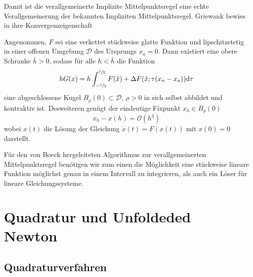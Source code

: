 Damit ist die verallgemeinerte Implizite Mittelpunktsregel eine echte Verallgemeinerung der bekannten Impliziten Mittelpunktsregel. 
Griewank bewies in \cite[Prop.4]{monster} ihre Konvergenzeigenschaft
\begin{theorem}
\label{thm:convergenceGenMidpoint}
 Angenommen, $F$ sei eine verkettet stückweise glatte Funktion und lipschitzstetig in einer offenen Umgebung $\mathcal D$ des Ursprungs $x_a =0$. Dann existiert eine obere Schranke $\bar h>0$, sodass für alle $h<\bar h$ die Funktion 
 \[
    hG(x) = h\int_{-\sfrac{1}{2}}^{\sfrac{1}{2}} F(\mathring{x}) + \Delta F(\mathring{x};\tau (x_n - x_a))  \text{d}\tau
 \] 
 eine abgeschlossene Kugel $B_\rho(0)\subset \mathcal D$, $\rho>0$ in sich selbst abbildet und kontraktiv ist.
 Desweiteren genügt der eindeutige Fixpunkt $x_h\in B_\rho(0)$
 \[
  x_h - x(h) = \mathcal O(h^3)
 \]
  wobei $x(t)$ die Lösung der Gleichung $\dot x(t) = F(x(t))$ mit  $x(0)= 0$ darstellt.
\end{theorem}

Für den von Boeck \cite{boeck14} hergeleiteten Algorithmus zur verallgemeinerten Mittelpunktsregel benötigen wir zum einen die Möglichkeit eine stückweise lineare Funktion möglichst genau in einem Intervall zu integrieren, als auch ein Löser für lineare Gleichungssysteme.

\section{Quadratur und Unfoldeded Newton}
\subsection{Quadraturverfahren}

